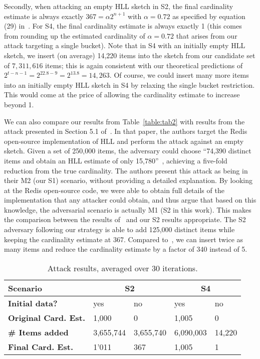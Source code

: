 \documentclass[11pt]{article}
\begin{document}
Secondly, when attacking an empty HLL sketch in S2, the final cardinality estimate is always exactly $367=\alpha2^{n+1}$ with $\alpha = 0.72$ as specified by equation (29) in~\cite{hll}. For S4, the final cardinality estimate is always exactly 1 (this comes from rounding up the estimated cardinality of $\alpha = 0.72$ that arises from our attack targeting a single bucket). Note that in S4 with an initially empty HLL sketch, we insert (on average) 14,220 items into the sketch from our candidate set of $7,311,616$ items; this is again consistent with our theoretical predictions of $2^{t-n-1} = 2^{22.8-9} = 2^{13.8} = 14,263$. Of course, we could insert many more items into an initially empty HLL sketch in S4 by relaxing the single bucket restriction. This would come at the price of allowing the cardinality estimate to increase beyond 1.

We can also compare our results from Table~\ref{table:tab2} with results from the attack presented in Section 5.1 of~\cite{hllvuln}. In that paper, the authors target the Redis~\cite{redis} open-source implementation of HLL and perform the attack against an empty sketch. Given a set of 250,000 items, the adversary could choose ``74,390 distinct items and obtain an HLL estimate of only 15,780''~\cite{hllvuln}, achieving a five-fold reduction from the true cardinality. The authors present this attack as being in their M2 (our S1) scenario, without providing a detailed explanation. By looking at the Redis open-source code, we were able to obtain full details of the implementation that any attacker could obtain, and thus argue that based on this knowledge, the adversarial scenario is actually M1 (S2 in this work). This makes the comparison between the results of~\cite{hllvuln} and our S2 results appropriate. The S2 adversary following our strategy is able to add 125,000 distinct items while keeping the cardinality estimate at 367. Compared to~\cite{hllvuln}, we can insert twice as many items and reduce the cardinality estimate by a factor of 340 instead of 5.

\begin{table}[h]
\centering
\caption{Attack results, averaged over 30 iterations.}
\begin{tabular}{| m{8.5em} | m{4em} | m{4em} | m{4em} | m{4em} |}
    \hline
    \textbf{Scenario} & \multicolumn{2}{c|}{S2} & \multicolumn{2}{c|}{S4} \\ \hline
    \textbf{Initial data?} & yes & no & yes & no \\ \hline
    \textbf{Original Card. Est.} & 1,000 & 0 & 1,005 & 0 \\ \hline
    \textbf{\# Items added} & 3,655,744 & 3,655,740 & 6,090,003 & 14,220 \\ \hline
    \textbf{Final Card. Est.} & 1'011 & 367 & 1,005 & 1 \\ \hline
\end{tabular}
\label{table:tab1}
\end{table}
\end{document}
